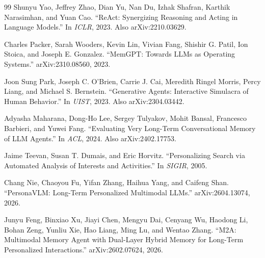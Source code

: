 \documentclass[11pt,a4paper]{article}
\begin{document}
\begin{thebibliography}{99}
Shunyu Yao, Jeffrey Zhao, Dian Yu, Nan Du, Izhak Shafran, Karthik Narasimhan, and Yuan Cao.
``ReAct: Synergizing Reasoning and Acting in Language Models.''
In \emph{ICLR}, 2023.
Also arXiv:2210.03629.

Charles Packer, Sarah Wooders, Kevin Lin, Vivian Fang, Shishir G. Patil, Ion Stoica, and Joseph E. Gonzalez.
``MemGPT: Towards LLMs as Operating Systems.''
arXiv:2310.08560, 2023.

Joon Sung Park, Joseph C. O'Brien, Carrie J. Cai, Meredith Ringel Morris, Percy Liang, and Michael S. Bernstein.
``Generative Agents: Interactive Simulacra of Human Behavior.''
In \emph{UIST}, 2023.
Also arXiv:2304.03442.

Adyasha Maharana, Dong-Ho Lee, Sergey Tulyakov, Mohit Bansal, Francesco Barbieri, and Yuwei Fang.
``Evaluating Very Long-Term Conversational Memory of LLM Agents.''
In \emph{ACL}, 2024.
Also arXiv:2402.17753.

Jaime Teevan, Susan T. Dumais, and Eric Horvitz.
``Personalizing Search via Automated Analysis of Interests and Activities.''
In \emph{SIGIR}, 2005.


Chang Nie, Chaoyou Fu, Yifan Zhang, Haihua Yang, and Caifeng Shan.
``PersonaVLM: Long-Term Personalized Multimodal LLMs.''
arXiv:2604.13074, 2026.

Junyu Feng, Binxiao Xu, Jiayi Chen, Mengyu Dai, Cenyang Wu, Haodong Li,
Bohan Zeng, Yunliu Xie, Hao Liang, Ming Lu, and Wentao Zhang.
``M2A: Multimodal Memory Agent with Dual-Layer Hybrid Memory for Long-Term Personalized Interactions.''
arXiv:2602.07624, 2026.

\end{thebibliography}
\end{document}
